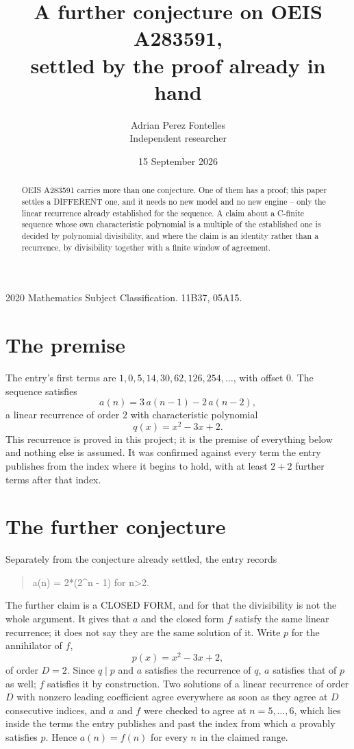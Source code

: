 \documentclass[11pt,a4paper]{article}
\title{A further conjecture on OEIS A283591,\\ \large settled by the proof already in hand}
\author{Adrian Perez Fontelles\\ \small Independent researcher}
\date{15 September 2026}
\theoremstyle{plain}
\theoremstyle{definition}
\begin{document}
\maketitle

\begin{abstract}
OEIS A283591 carries more than one conjecture. One of them has a proof; this paper settles a
DIFFERENT one, and it needs no new model and no new engine -- only the linear recurrence already
established for the sequence. A claim about a C-finite sequence whose own characteristic
polynomial is a multiple of the established one is decided by polynomial divisibility, and where
the claim is an identity rather than a recurrence, by divisibility together with a finite window
of agreement.
\end{abstract}

\noindent\small 2020 Mathematics Subject Classification. 11B37, 05A15.\normalsize

\section{The premise}

The entry's first terms are $1, 0, 5, 14, 30, 62, 126, 254,\dots$, with offset $0$. The sequence satisfies
\[
  a(n)=3\,a(n-1) - 2\,a(n-2) ,
\]
a linear recurrence of order $2$ with characteristic polynomial
\[
  q(x)=x^{2} - 3 x + 2 .
\]
This recurrence is proved in this project; it is the premise of everything below and nothing else is assumed.
It was confirmed against every term the entry publishes from the index where it begins to hold,
with at least $2+2$ further terms after that index.

\section{The further conjecture}

Separately from the conjecture already settled, the entry records

\begin{quote}\raggedright a(n) = 2*(2\^{}n - 1) for n>2.\end{quote}

The further claim is a CLOSED FORM, and for that the divisibility is not the whole argument. It
gives that $a$ and the closed form $f$ satisfy the same linear recurrence; it does not say they
are the same solution of it. Write $p$ for the annihilator of $f$,
\[
  p(x)=x^{2} - 3 x + 2 ,
\]
of order $D=2$. Since $q\mid p$ and $a$ satisfies the recurrence of $q$, $a$ satisfies that of
$p$ as well; $f$ satisfies it by construction. Two solutions of a linear recurrence of order $D$
with nonzero leading coefficient agree everywhere as soon as they agree at $D$ consecutive
indices, and $a$ and $f$ were checked to agree at $n=5,\dots,6$,
which lies inside the terms the entry publishes and past the index from which $a$ provably
satisfies $p$. Hence $a(n)=f(n)$ for every $n$ in the claimed range.
\end{document}
